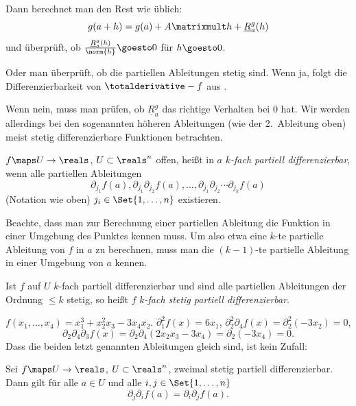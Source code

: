 Dann berechnet man den Rest wie üblich:
\begin{equation*}
  g(a+h)=g(a)+A\matrixmult h+ \underline{R}_a^g(h)
\end{equation*}
und überprüft, ob \( \frac{\underline{R}_a^g(h)}{\norm{h}}\goesto 0 \) für \( h\goesto 0 \).

Oder man überprüft, ob die partiellen Ableitungen stetig sind. Wenn ja, folgt die Differenzierbarkeit von \( \totalderivative-{f} \) aus .

Wenn nein, muss man prüfen, ob \( \underline{R}_a^g \) das richtige Verhalten bei \( 0 \) hat. Wir werden allerdings bei den sogenannten höheren Ableitungen (wie der 2.\ Ableitung oben) meist stetig differenzierbare Funktionen betrachten.

\begin{definition}
  \( f\maps U\to \reals \), \( U\subset \reals^n \) offen, heißt in \( a \) \emph{\( k \)-fach partiell differenzierbar}, wenn alle partiellen Ableitungen
  \begin{equation*}
    \partial_{j_1} f(a), \partial_{j_1} \partial_{j_2} f(a),\dotsc, \partial_{j_1}\partial_{j_2}\dotsb\partial_{j_k} f(a)
  \end{equation*}
  (Notation wie oben) \( j_i\in \Set{1,\dotsc,n} \) existieren.
  \begin{achtung*}
    Beachte, dass man zur Berechnung einer partiellen Ableitung die Funktion in einer Umgebung des Punktes kennen muss. Um also etwa eine \( k \)-te partielle Ableitung von \( f \) in \( a \) zu berechnen, muss man die \( (k-1) \)-te partielle Ableitung in einer Umgebung von \( a \) kennen.
  \end{achtung*}
  Ist \( f \) auf \( U \) \( k \)-fach partiell differenzierbar und sind alle partiellen Ableitungen der Ordnung \( \leq k \) stetig, so heißt \( f \) \emph{\( k \)-fach stetig partiell differenzierbar}.
\end{definition}
\begin{beispiel*}
  \( f(x_1,\dotsc,x_4)=x_1^3+x_2^2x_3-3x_4x_2 \). \( \partial_1^2 f(x)=6x_1 \), \( \partial_2^2 \partial_4 f(x)=\partial_2^2(-3x_2)=0 \),
  \begin{equation*}
    \partial_2 \partial_4 \partial_3 f(x)=\partial_2 \partial_4 (2x_2 x_3-3x_4)=\partial_2 (-3x_4)=0.
  \end{equation*}
  Dass die beiden letzt genannten Ableitungen gleich sind, ist kein Zufall:
\end{beispiel*}
\begin{satz}\label{schwarzscher_satz}
  Sei \( f\maps U\to \reals \), \( U\subset \reals^n \), zweimal stetig partiell differenzierbar. Dann gilt für alle \( a\in U \) und alle \( i,j\in \Set{1,\dotsc,n} \)
  \begin{equation*}
    \partial_j \partial_i f(a)=\partial_i \partial_j f(a).
  \end{equation*}
\end{satz}
